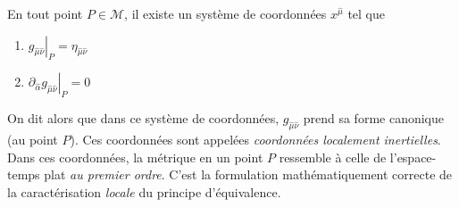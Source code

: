 \begin{theoremframe}
    \begin{propri}
        \label{prop: PE}
        En tout point $P \in \mathcal{M}$, il existe un système de coordonnées $x^{\hat{\mu}}$ tel que
       \begin{enumerate}
           \item $\left. g_{\hat{\mu}\hat{\nu}} \right|_P = \eta_{\hat{\mu}\hat{\nu}}$
           \item $ \left. \partial_{\hat{\alpha}}g_{\hat{\mu}\hat{\nu}} \right|_P=0$
           \label{Propriété 4.1}
       \end{enumerate}
       \label{localement métrique de Minkowski}
    \end{propri}    
\end{theoremframe}
On dit alors que dans ce système de coordonnées, $g_{\hat{\mu}\hat{\nu}}$ prend sa forme canonique (au point $P$). Ces coordonnées sont appelées \textit{coordonnées localement inertielles}. Dans ces coordonnées, la métrique en un point $P$ ressemble à celle de l'espace-temps plat \emph{au premier ordre}. C'est la formulation mathématiquement correcte de la caractérisation \emph{locale} du principe d'équivalence.

